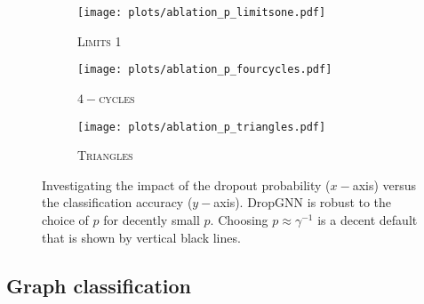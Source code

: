 \documentclass{article}
\begin{document}
\begin{figure}
\begin{subfigure}{0.3\textwidth}
    \centering
    \texttt{[image: plots/ablation\_p\_limitsone.pdf]}
    \caption{\textsc{Limits 1}}
    \label{fig:p_ablation_limitsone}
\end{subfigure}\hfill
\begin{subfigure}{0.3\textwidth}
    \centering
    \texttt{[image: plots/ablation\_p\_fourcycles.pdf]}
    \caption{\textsc{$4-$cycles}}
    \label{fig:p_ablation-4cycles}
\end{subfigure}\hfill
\begin{subfigure}{0.3\textwidth}
    \centering
    \texttt{[image: plots/ablation\_p\_triangles.pdf]}
    \caption{\textsc{Triangles}}
    \label{fig:p_ablation_triangles}
\end{subfigure}
    \caption{Investigating the impact of the dropout probability ($x-$axis) versus the classification accuracy ($y-$axis). DropGNN is robust to the choice of $p$ for decently small $p$. Choosing $p\approx \gamma^{-1}$ is a decent default that is shown by vertical black lines.}
    \label{fig:p_ablation}
\end{figure}

\subsection{Graph classification}
\end{document}
